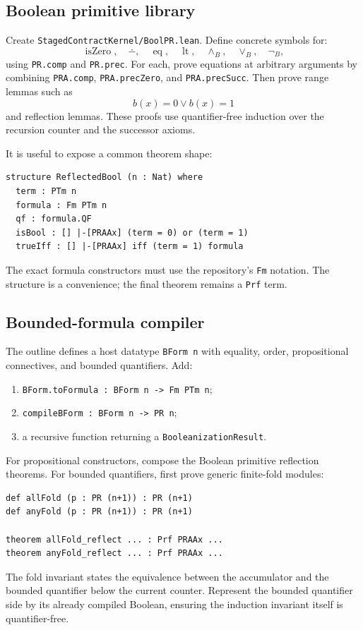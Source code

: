 \subsection{Boolean primitive library}

Create \texttt{StagedContractKernel/BoolPR.lean}.  Define concrete symbols for:
\[
 \operatorname{isZero},\quad \dotminus,\quad \operatorname{eq},\quad
 \operatorname{lt},\quad \wedge_B,\quad\vee_B,\quad\neg_B,
\]
using \texttt{PR.comp} and \texttt{PR.prec}.  For each, prove equations at arbitrary arguments by combining
\texttt{PRA.comp}, \texttt{PRA.precZero}, and \texttt{PRA.precSucc}.  Then prove range lemmas such as
\[
 b(x)=0\vee b(x)=1
\]
and reflection lemmas.  These proofs use quantifier-free induction over the recursion counter and the
successor axioms.

It is useful to expose a common theorem shape:
\begin{lstlisting}[language={}]
structure ReflectedBool (n : Nat) where
  term : PTm n
  formula : Fm PTm n
  qf : formula.QF
  isBool : [] |-[PRAAx] (term = 0) or (term = 1)
  trueIff : [] |-[PRAAx] iff (term = 1) formula
\end{lstlisting}
The exact formula constructors must use the repository's \texttt{Fm} notation.  The structure is a
convenience; the final theorem remains a \texttt{Prf} term.

\subsection{Bounded-formula compiler}

The outline defines a host datatype \texttt{BForm n} with equality, order, propositional connectives, and
bounded quantifiers.  Add:
\begin{enumerate}
  \item \texttt{BForm.toFormula : BForm n -> Fm PTm n};
  \item \texttt{compileBForm : BForm n -> PR n};
  \item a recursive function returning a \texttt{BooleanizationResult}.
\end{enumerate}
For propositional constructors, compose the Boolean primitive reflection theorems.  For bounded quantifiers,
first prove generic finite-fold modules:
\begin{lstlisting}[language={}]
def allFold (p : PR (n+1)) : PR (n+1)
def anyFold (p : PR (n+1)) : PR (n+1)

theorem allFold_reflect ... : Prf PRAAx ...
theorem anyFold_reflect ... : Prf PRAAx ...
\end{lstlisting}
The fold invariant states the equivalence between the accumulator and the bounded quantifier below the
current counter.  Represent the bounded quantifier side by its already compiled Boolean, ensuring the
induction invariant itself is quantifier-free.

